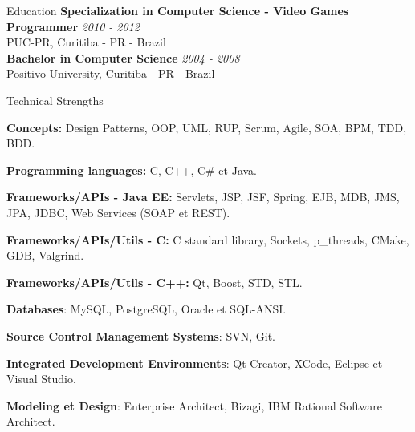 \documentclass{resume}
\begin{document}
  \begin{rSection}{Education}
    {\bf Specialization in Computer Science - Video Games Programmer } \hfill {\em 2010 - 2012} \\
    {PUC-PR, Curitiba - PR - Brazil} \\ 

    {\bf Bachelor in Computer Science } \hfill {\em 2004 - 2008} \\
    {Positivo University, Curitiba - PR - Brazil}   
  \end{rSection}
  
  \begin{rSection}{Technical Strengths}
    \begin{rSubsection}{}{}{}{}
      \item {\bf Concepts:} Design Patterns, OOP, UML, RUP, Scrum, Agile, SOA, BPM, TDD, BDD.
      \item {\bf Programming languages:} C, C++, C\# et Java.
      \item {\bf Frameworks/APIs - Java EE:} Servlets, JSP, JSF, Spring, EJB, MDB, JMS, JPA, JDBC, Web Services (SOAP et REST).
      \item {\bf Frameworks/APIs/Utils - C:} C standard library, Sockets, p\_threads, CMake, GDB, Valgrind.
      \item {\bf Frameworks/APIs/Utils - C++:} Qt, Boost, STD, STL.
      \item {\bf Databases}: MySQL, PostgreSQL, Oracle et SQL-ANSI.
      \item {\bf Source Control Management Systems}: SVN, Git.
      \item {\bf Integrated Development Environments}: Qt Creator, XCode, Eclipse et Visual Studio.
      \item {\bf Modeling et Design}: Enterprise Architect, Bizagi, IBM Rational Software Architect.
    \end{rSubsection}
  \end{rSection}
\end{document}

